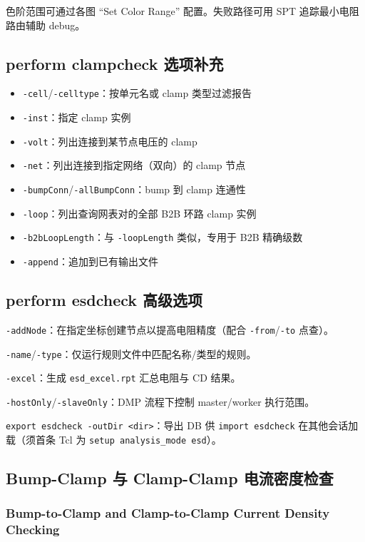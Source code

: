 色阶范围可通过各图 ``Set Color Range'' 配置。失败路径可用 SPT 追踪最小电阻路由辅助 debug。

\subsection{perform clampcheck 选项补充}
\begin{itemize}
  \item \texttt{-cell}/\texttt{-celltype}：按单元名或 clamp 类型过滤报告
  \item \texttt{-inst}：指定 clamp 实例
  \item \texttt{-volt}：列出连接到某节点电压的 clamp
  \item \texttt{-net}：列出连接到指定网络（双向）的 clamp 节点
  \item \texttt{-bumpConn}/\texttt{-allBumpConn}：bump 到 clamp 连通性
  \item \texttt{-loop}：列出查询网表对的全部 B2B 环路 clamp 实例
  \item \texttt{-b2bLoopLength}：与 \texttt{-loopLength} 类似，专用于 B2B 精确级数
  \item \texttt{-append}：追加到已有输出文件
\end{itemize}

\subsection{perform esdcheck 高级选项}
\texttt{-addNode}：在指定坐标创建节点以提高电阻精度（配合 \texttt{-from}/\texttt{-to} 点查）。

\texttt{-name}/\texttt{-type}：仅运行规则文件中匹配名称/类型的规则。

\texttt{-excel}：生成 \texttt{esd\_excel.rpt} 汇总电阻与 CD 结果。

\texttt{-hostOnly}/\texttt{-slaveOnly}：DMP 流程下控制 master/worker 执行范围。

\texttt{export esdcheck -outDir <dir>}：导出 DB 供 \texttt{import esdcheck} 在其他会话加载（须首条 Tcl 为 \texttt{setup analysis\_mode esd}）。

\subsection{Bump-Clamp 与 Clamp-Clamp 电流密度检查}
\subsubsection*{Bump-to-Clamp and Clamp-to-Clamp Current Density Checking}

